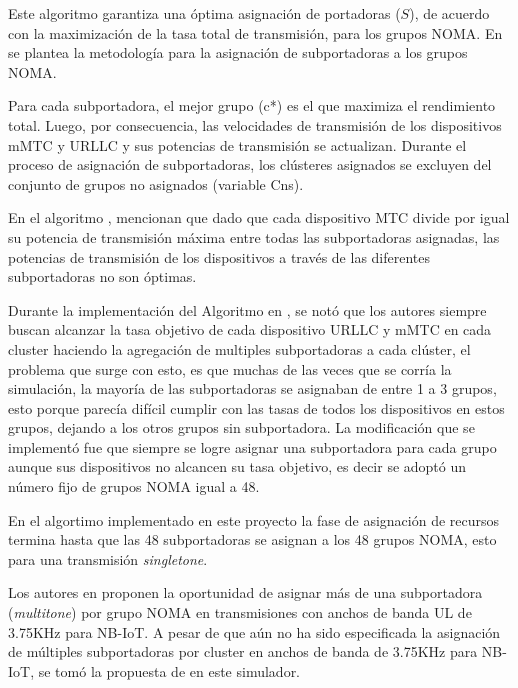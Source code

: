 Este algoritmo garantiza una óptima asignación de portadoras ($S$), de acuerdo con la maximización de la tasa total de transmisión, para los grupos NOMA. En \parencite{Shahini2019} se plantea la metodología para la asignación de subportadoras a los grupos NOMA. \newline

Para cada subportadora, el mejor grupo (c*) es el que maximiza el rendimiento total. Luego, por consecuencia, las velocidades de transmisión de los dispositivos mMTC y URLLC y sus potencias de transmisión se actualizan. Durante el proceso de asignación de subportadoras, los clústeres asignados se excluyen del conjunto de grupos no asignados (variable Cns). \newline

En el algoritmo \parencite{Shahini2019}, mencionan que dado que cada dispositivo MTC divide por igual su potencia de transmisión máxima entre todas las subportadoras asignadas, las potencias de transmisión de los dispositivos a través de las diferentes subportadoras no son óptimas. \newline

Durante la implementación del Algoritmo en \parencite{Shahini2019}, se notó que los autores \parencite{Shahini2019} siempre buscan alcanzar la tasa objetivo de cada dispositivo URLLC y mMTC en cada cluster haciendo la agregación de multiples subportadoras a cada clúster, el problema que surge con esto, es que muchas de las veces que se corría la simulación, la mayoría de las subportadoras se asignaban de entre 1 a 3 grupos, esto porque parecía difícil cumplir con las tasas de todos los dispositivos en estos grupos, dejando a los otros grupos sin subportadora. La modificación que se implementó fue que siempre se logre asignar una subportadora para cada grupo aunque sus dispositivos no alcancen su tasa objetivo, es decir se adoptó un número fijo de grupos NOMA igual a 48. \newline

En el algortimo implementado en este proyecto la fase de asignación de recursos termina hasta que las 48 subportadoras se asignan a los 48 grupos NOMA, esto para una transmisión \textit{singletone}. \newline

Los autores en \parencite{Shahini2019} proponen la oportunidad de asignar más de una subportadora (\textit{multitone}) por grupo NOMA en transmisiones con anchos de banda UL de 3.75KHz para NB-IoT. A pesar de que aún no ha sido especificada la asignación de múltiples subportadoras por cluster en anchos de banda de 3.75KHz para NB-IoT, se tomó la propuesta de \parencite{Shahini2019} en este simulador. \newline

